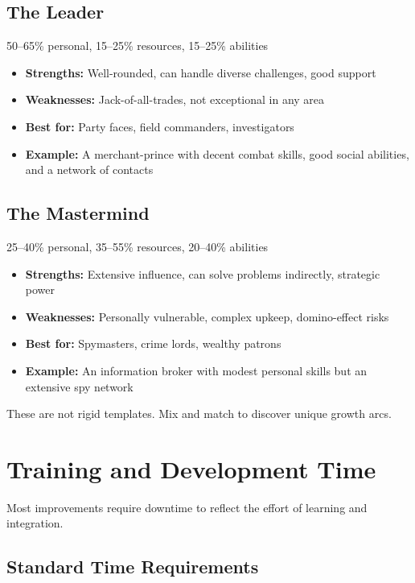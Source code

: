 \documentclass[11pt,twoside,openany]{book}
\begin{document}
\subsection*{The Leader}

50–65\% personal, 15–25\% resources, 15–25\% abilities
\begin{itemize}
\item \textbf{Strengths:} Well-rounded, can handle diverse challenges, good support
\item \textbf{Weaknesses:} Jack-of-all-trades, not exceptional in any area
\item \textbf{Best for:} Party faces, field commanders, investigators
\item \textbf{Example:} A merchant-prince with decent combat skills, good social abilities, and a network of contacts
\end{itemize}

\subsection*{The Mastermind}

25–40\% personal, 35–55\% resources, 20–40\% abilities
\begin{itemize}
\item \textbf{Strengths:} Extensive influence, can solve problems indirectly, strategic power
\item \textbf{Weaknesses:} Personally vulnerable, complex upkeep, domino-effect risks
\item \textbf{Best for:} Spymasters, crime lords, wealthy patrons
\item \textbf{Example:} An information broker with modest personal skills but an extensive spy network
\end{itemize}

\begin{tcolorbox}[colback=gray!5!white, colframe=gray!75!black, title=Player Note, fonttitle=\bfseries]
These are not rigid templates. Mix and match to discover unique growth arcs.
\end{tcolorbox}

\section*{Training and Development Time} 

Most improvements require downtime to reflect the effort of learning and integration.

\subsection*{Standard Time Requirements}
\end{document}
